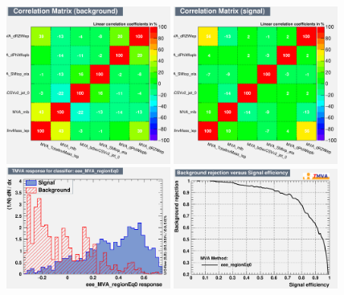 \begin{figure}[htbp]
	\includegraphics[width=0.48\textwidth]{6_Search/Figures/MVAtechnics/singletopzct/eee/CorrelationMatrixB.png}
	\includegraphics[width=0.48\textwidth]{6_Search/Figures/MVAtechnics/singletopzct/eee/CorrelationMatrixS.png}
	\includegraphics[width=0.48\textwidth]{6_Search/Figures/MVAtechnics/singletopzct/eee/mva_eee_MVA_regionEq0.png}
	\includegraphics[width=0.48\textwidth]{6_Search/Figures/MVAtechnics/singletopzct/eee/rejBvsS.png}

\end{figure}
